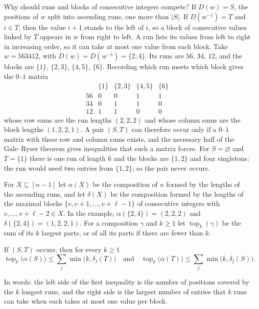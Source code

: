 \documentclass[12pt]{article}
\numberwithin{theorem}{section}
\numberwithin{equation}{section}
\begin{document}
Why should runs and blocks of consecutive integers compete? If $D(w)=S$, the positions of $w$ split into
ascending runs, one more than $|S|$. If $D(w^{-1})=T$ and $i\in T$, then the value $i+1$ stands to the left of $i$,
so a block of consecutive values linked by $T$ appears in $w$ from right to left. A run lists its values from left
to right in increasing order, so it can take at most one value from each block. Take $w=563412$, with
$D(w)=D(w^{-1})=\{2,4\}$. Its runs are $56$, $34$, $12$, and the blocks are $\{1\}$, $\{2,3\}$, $\{4,5\}$, $\{6\}$.
Recording which run meets which block gives the $0$--$1$ matrix
\[
\begin{array}{c|cccc}
 & \{1\} & \{2,3\} & \{4,5\} & \{6\}\\\hline
56 & 0&0&1&1\\
34 & 0&1&1&0\\
12 & 1&1&0&0
\end{array}
\]
whose row sums are the run lengths $(2,2,2)$ and whose column sums are the block lengths $(1,2,2,1)$. A pair
$(S,T)$ can therefore occur only if a $0$--$1$ matrix with these row and column sums exists, and the necessary half of
the Gale--Ryser theorem gives inequalities that such a matrix forces. For $S=\varnothing$ and $T=\{1\}$ there is one run of length $6$ and the blocks are $\{1,2\}$ and four
singletons; the run would need two entries from $\{1,2\}$, so the pair never occurs.

For $X\subseteq[n-1]$ let $\alpha(X)$ be the composition of $n$ formed by the lengths of the ascending runs, and
let $\delta(X)$ be the composition formed by the lengths of the maximal blocks $\{v,v+1,\dots,v+\ell-1\}$ of
consecutive integers with $v,\dots,v+\ell-2\in X$. In the example, $\alpha(\{2,4\})=(2,2,2)$ and
$\delta(\{2,4\})=(1,2,2,1)$. For a composition $\gamma$ and $k\ge1$ let
$\operatorname{top}_k(\gamma)$ be the sum of its $k$ largest parts, or of all its parts if there are fewer than $k$.

\begin{lemma}\label{lem:gr}
If $(S,T)$ occurs, then for every $k\ge1$
\begin{equation}\label{eq:gr}
\operatorname{top}_k\bigl(\alpha(S)\bigr)\le\sum_j\min\bigl(k,\delta_j(T)\bigr)
\quad\text{and}\quad
\operatorname{top}_k\bigl(\alpha(T)\bigr)\le\sum_j\min\bigl(k,\delta_j(S)\bigr).
\end{equation}
\end{lemma}

In words: the left side of the first inequality is the number of positions covered by the $k$ longest runs, and the
right side is the largest number of entries that $k$ runs can take when each takes at most one value per block.
\end{document}
